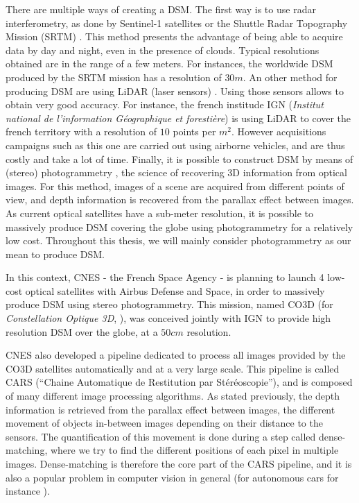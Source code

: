 There are multiple ways of creating a DSM. The first way is to use radar interferometry, as done by Sentinel-1 satellites \cite{geudtner_sentinel-1_2014} or the Shuttle Radar Topography Mission (SRTM) \cite{farr_shuttle_2007}. This method presents the advantage of being able to acquire data by day and night, even in the presence of clouds. Typical resolutions obtained are in the range of a few meters. For instances, the worldwide DSM produced by the SRTM mission has a resolution of $30m$. An other method for producing DSM are using LiDAR (laser sensors) \cite{khosravipour_generating_2016}. Using those sensors allows to obtain very good accuracy. For instance, the french institude IGN (\textit{Institut national de l'information Géographique et forestière}) is using LiDAR to cover the french territory with a resolution of $10$ points per $m^2$. However acquisitions campaigns such as this one are carried out using airborne vehicles, and are thus costly and take a lot of time. Finally, it is possible to construct DSM by means of (stereo) photogrammetry \cite{tao_comprehensive_2001}, \ie the science of recovering 3D information from optical images. For this method, images of a scene are acquired from different points of view, and depth information is recovered from the parallax effect between images. As current optical satellites have a sub-meter resolution, it is possible to massively produce DSM covering the globe using photogrammetry for a relatively low cost. Throughout this thesis, we will mainly consider photogrammetry as our mean to produce DSM.

In this context, CNES - the French Space Agency - is planning to launch 4 low-cost optical satellites with Airbus Defense and Space, in order to massively produce DSM using stereo photogrammetry. This mission, named CO3D (for \textit{Constellation Optique 3D}, \cite{melet_co3d_2020}), was conceived jointly with IGN to provide high resolution DSM over the globe, at a $50cm$ resolution.

CNES also developed a pipeline dedicated to process all images provided by the CO3D satellites automatically and at a very large scale. This pipeline is called CARS (``Chaine Automatique de Restitution par Stéréoscopie''), and is composed of many different image processing algorithms. As stated previously, the depth information is retrieved from the parallax effect between images, \ie the different movement of objects in-between images depending on their distance to the sensors. The quantification of this movement is done during a step called dense-matching, where we try to find the different positions of each pixel in multiple images. Dense-matching is therefore the core part of the CARS pipeline, and it is also a popular problem in computer vision in general (for autonomous cars for instance \cite{geiger_are_2012}).


